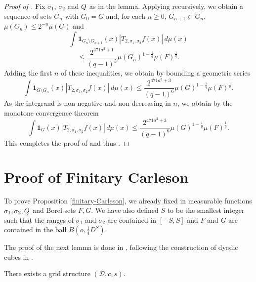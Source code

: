 \begin{proof}[Proof of ]
\leanok
Fix $\sigma_1$, $\sigma_2$ and ${Q}$ as in the lemma. Applying  recursively, we obtain a sequence of sets $G_n$ with $G_0=G$ and, for each $n\ge 0$, $G_{n+1} \subset G_n$, $\mu(G_{n})\le 2^{-n} \mu(G)$ and
\begin{equation*}
    \int \mathbf{1}_{G_{n}\setminus G_{n+1}}(x)
    \left| {T}_{2,\sigma_1,\sigma_2} f(x) \right|\, d\mu(x)
\end{equation*}
\begin{equation}
    \le \frac{2^{471a^3+1}}{(q-1)^5} \mu(G_n)^{1 - \frac{1}{q}} \mu(F)^{\frac{1}{q}}.
\end{equation}
Adding the first $n$ of these inequalities, we obtain by bounding a geometric series
    \begin{equation} \label{Sqcut2}
    \int \mathbf{1}_{G\setminus G_{n}}(x)
\left| {T}_{2,\sigma_1,\sigma_2}f(x) \right|\, d\mu(x)
\le \frac{2^{471a^3+3}}{(q-1)^6} \mu(G)^{1-\frac{1}{q}} \mu(F)^{\frac{1}{q}}.
\end{equation}
As the integrand is non-negative and non-decreasing in $n$, we obtain by the monotone convergence theorem
 \begin{equation} \label{Sqcut3}
    \int \mathbf{1}_{G}(x)
\left| {T}_{2,\sigma_1,\sigma_2}f(x) \right|\, d\mu(x)
\le \frac{2^{471a^3+3}}{(q-1)^6} \mu(G)^{1-\frac{1}{q}} \mu(F)^{\frac{1}{q}}.
\end{equation}
This completes the proof of 
and thus .
\end{proof}

\chapter{Proof of Finitary Carleson}
\label{christsection}

To prove Proposition
\ref{finitary-Carleson}, we already fixed in 
measurable functions ${\sigma_1},\sigma_2, {Q}$ and Borel sets $F,G$. We have also
defined $S$ to be the smallest
integer such that the ranges of
$\sigma_1$ and $\sigma_2$ are contained in $[-S,S]$ and $F$ and $G$ are contained
in the ball $B(o, \frac 14 D^S)$.


The proof of the next lemma is done in ,
following the construction of dyadic cubes in \cite[\S 3]{christ1990b}.

\begin{lemma}
    \label{grid-existence}
    \leanok
     There exists a grid structure $(\mathcal{D}, c,s)$.
\end{lemma}




